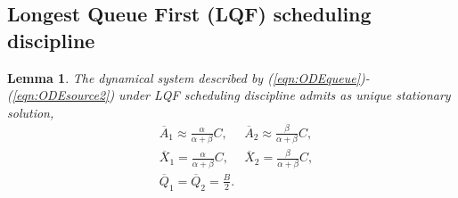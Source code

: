 \documentclass[a4paper,oneside, 11pt]{article}
\newtheorem{lem}[theorem]{Lemma}
\begin{document}
\subsection{Longest Queue First (LQF) scheduling discipline}\label{sec:LQF}
\begin{lem}
 The dynamical system described by (\ref{eqn:ODEqueue})-(\ref{eqn:ODEsource2}) under LQF scheduling discipline admits as unique stationary solution,
\begin{align*}
&\overline{A}_1\approx\frac{\alpha}{\alpha+\beta}C, &\overline{A}_2\approx\frac{\beta}{\alpha+\beta}C, \nonumber \\
&\overline{X}_1=\frac{\alpha}{\alpha+\beta}C, &\overline{X}_2=\frac{\beta}{\alpha+\beta}C, \nonumber \\
&\overline{Q}_1=\overline{Q}_2=\frac{B}{2}.
\end{align*}
\end{lem}
\end{document}
